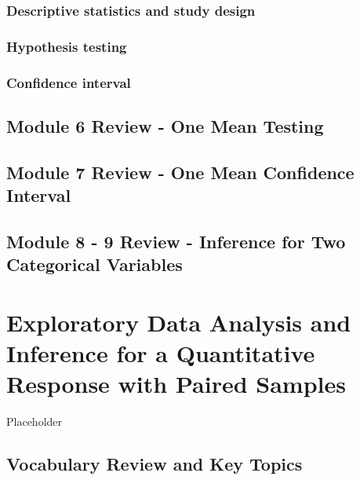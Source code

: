 \documentclass[
]{report}
\begin{document}
\subsection*{Descriptive statistics and study design}\label{descriptive-statistics-and-study-design-1}

\subsection*{Hypothesis testing}\label{hypothesis-testing-4}

\subsection*{Confidence interval}\label{confidence-interval-2}

\section{Module 6 Review - One Mean Testing}\label{module-6-review---one-mean-testing}

\section{Module 7 Review - One Mean Confidence Interval}\label{module-7-review---one-mean-confidence-interval}

\section{Module 8 - 9 Review - Inference for Two Categorical Variables}\label{module-8---9-review---inference-for-two-categorical-variables}

\chapter{Exploratory Data Analysis and Inference for a Quantitative Response with Paired Samples}\label{exploratory-data-analysis-and-inference-for-a-quantitative-response-with-paired-samples}

Placeholder

\section{Vocabulary Review and Key Topics}\label{vocabulary-review-and-key-topics-8}
\end{document}

